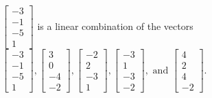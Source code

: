 \begin{exercise}
\begin{exerciseStatement}
  \end{exerciseStatement}
  \begin{exerciseAnswer}
   \(\left[\begin{array}{c}
-3 \\
-1 \\
-5 \\
1
\end{array}\right]\) 
  	 is  
	a linear combination of the vectors \(\left[\begin{array}{c}
-3 \\
-1 \\
-5 \\
1
\end{array}\right] , \left[\begin{array}{c}
3 \\
0 \\
-4 \\
-2
\end{array}\right] , \left[\begin{array}{c}
-2 \\
2 \\
-3 \\
1
\end{array}\right] , \left[\begin{array}{c}
-3 \\
1 \\
-3 \\
-2
\end{array}\right] , \text{ and } \left[\begin{array}{c}
4 \\
2 \\
4 \\
-2
\end{array}\right]\).

	
  


  \end{exerciseAnswer}
\end{exercise}